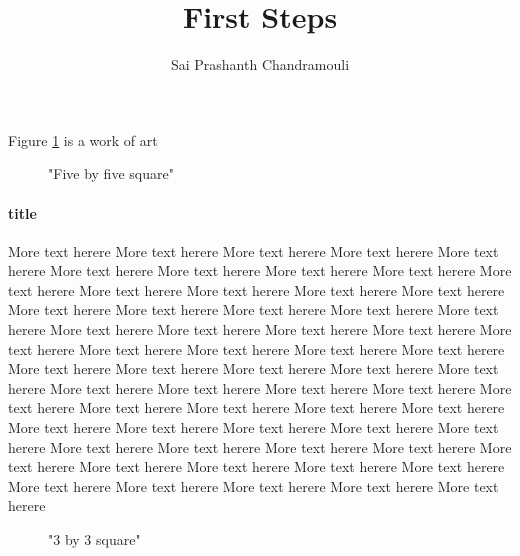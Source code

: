 \documentclass[a4paper,12pt,titlepage]{article} %
\author{Sai Prashanth Chandramouli}
\title{First Steps}
\begin{document}
	\listoffigures
	\pagebreak
	Figure \ref{white} is a work of art %
	\begin{figure}[!htbp] %
		\makebox[\textwidth]{\framebox[5cm]{\rule{0pt}{5cm}}}
		\caption[Short square]{"Five by five square" \label{white}}
		
	\end{figure}
	
	\paragraph{title}
	More text herere	More text herere	More text herere	More text herere	More text herere	More text herere	More text herere	More text herere	More text herere	More text herere	More text herere	More text herere	More text herere	More text herere	More text herere	More text herere	More text herere	More text herere	More text herere	More text herere	More text herere	More text herere	More text herere	More text herere	More text herere	More text herere	More text herere	More text herere	More text herere	More text herere	More text herere	More text herere	More text herere	More text herere	More text herere	More text herere	More text herere	More text herere	More text herere	More text herere	More text herere	More text herere	More text herere	More text herere	More text herere	More text herere	More text herere	More text herere	More text herere	More text herere	More text herere	More text herere	More text herere	More text herere	More text herere	More text herere	More text herere	More text herere	More text herere	More text herere	More text herere
	\pagebreak
	\begin{figure}[!htbp] %
		\makebox[\textwidth]{\framebox[3cm]{\rule{0pt}{3cm}}}
		\caption[3 square]{"3 by 3 square" \label{black}}
		
	\end{figure}
\end{document}
